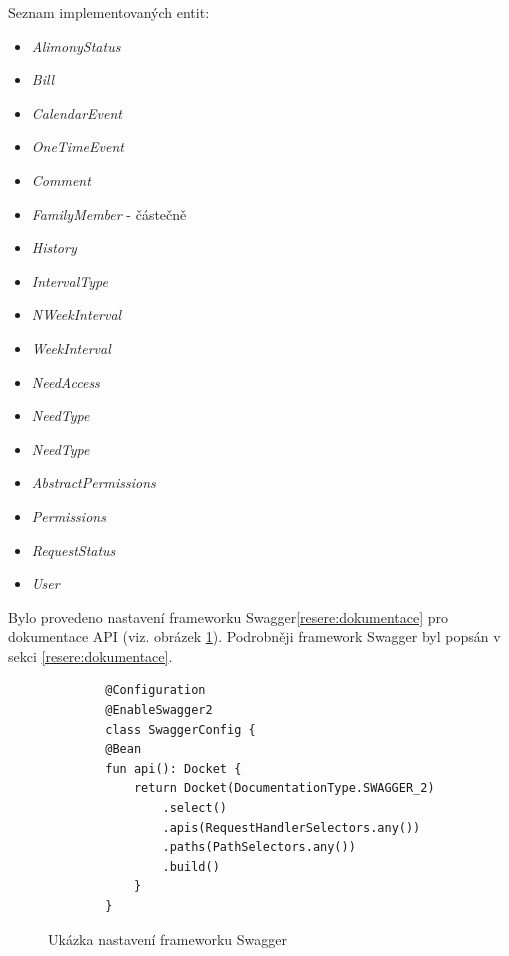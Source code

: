         Seznam implementovaných entit:
        \begin{itemize}
            \item \textit{AlimonyStatus}
            \item \textit{Bill}
            \item \textit{CalendarEvent}
            \item \textit{OneTimeEvent}
            \item \textit{Comment}
            \item \textit{FamilyMember} - částečně
            \item \textit{History}
            \item \textit{IntervalType}
            \item \textit{NWeekInterval}
            \item \textit{WeekInterval}
            \item \textit{NeedAccess}
            \item \textit{NeedType}
            \item \textit{NeedType}
            \item \textit{AbstractPermissions}
            \item \textit{Permissions}
            \item \textit{RequestStatus}
            \item \textit{User}
        \end{itemize}
        
        Bylo provedeno nastavení frameworku Swagger\ref{resere:dokumentace} pro dokumentace API (viz. obrázek \ref{code:swagger-configuration}). Podrobněji framework Swagger byl popsán v sekci \ref{resere:dokumentace}.
        \begin{figure}
        \begin{verbatim}
        @Configuration
        @EnableSwagger2
        class SwaggerConfig {
        @Bean
        fun api(): Docket {
            return Docket(DocumentationType.SWAGGER_2)
                .select()
                .apis(RequestHandlerSelectors.any())
                .paths(PathSelectors.any())
                .build()
            }
        }
        \end{verbatim}
        \caption{Ukázka nastavení frameworku Swagger} 
        \label{code:swagger-configuration}
        \end{figure}
        
